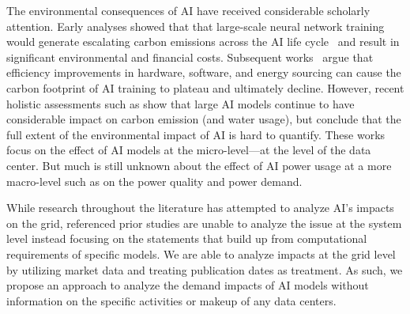 The environmental consequences of AI have received considerable scholarly attention. Early analyses showed that that large-scale neural network training would generate escalating carbon emissions across the AI life cycle~\cite{strubell19,schwartz2020green,RN7, RN5} and result in significant environmental and financial costs. Subsequent works~\cite{RN2, RN8} argue that efficiency improvements in hardware, software, and energy sourcing can cause the carbon footprint of AI training to plateau and ultimately decline. However, recent holistic assessments such as \cite{morrison2025holistically} show that large AI models continue to have considerable impact on carbon emission (and water usage), but conclude that the full extent of the environmental impact of AI is hard to quantify. %
 These works focus on the effect of AI models at the micro-level---at the level of the data center. But much is still unknown about the effect of AI power usage at a more macro-level such as on the power quality and power demand. 
 
 While research throughout the literature has attempted to analyze AI's impacts on the grid, referenced prior studies are unable to analyze the issue at the system level instead focusing on the statements that build up from computational requirements of specific models. We are able to analyze impacts at the grid level by utilizing market data and treating publication dates as treatment. As such, we propose an approach to analyze the demand impacts of AI models without information on the specific activities or makeup of any data centers.
